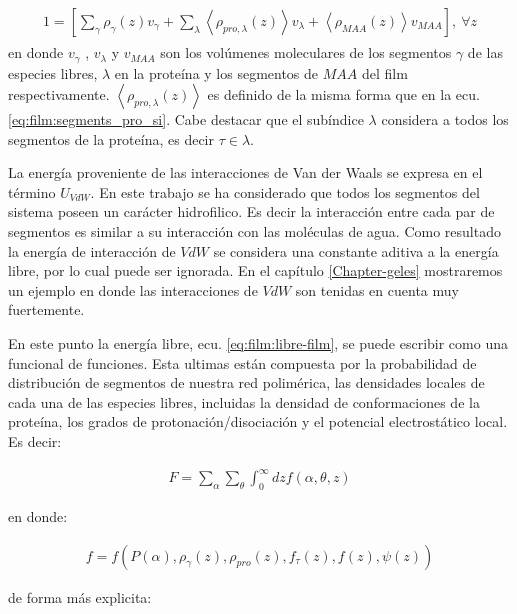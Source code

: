 \begin{align}
	\begin{aligned}
		1=  {\left[\sum_{\gamma}\rho_\gamma(z) v_\gamma + \sum_\lambda{\left<\rho_{pro,\lambda}(z)\right>v_\lambda} + \left<\rho_{MAA}(z)\right>v_{MAA} \right]},~ \forall z
	\end{aligned}
	\label{eq:film:constraint}
\end{align}
\noindent en donde $v_\gamma$ , $v_\lambda$ y $v_{MAA}$ son los vol\'umenes moleculares de los segmentos $\gamma$ de las especies libres, $\lambda$  en la prote\'ina y los segmentos de $MAA$ del film respectivamente.
$\left<\rho_{pro,\lambda}(z)\right>$ es definido de la misma forma que en la ecu.  \ref{eq:film:segments_pro_si}.
Cabe destacar que el sub\'indice $\lambda$ considera a todos los segmentos de la prote\'ina, es decir $ \tau \in \lambda$.

La energ\'ia proveniente de las interacciones de Van der Waals se expresa en el t\'ermino $U_{VdW}$. En este trabajo se ha considerado que todos los segmentos del sistema poseen un car\'acter hidrofilico. Es decir la interacci\'on entre cada par de segmentos es similar a su interacci\'on con las mol\'eculas de agua. Como resultado la energ\'ia de interacci\'on de $VdW$ se considera una constante aditiva a la energ\'ia libre, por lo cual puede ser ignorada. En el cap\'itulo \ref{Chapter-geles} mostraremos un ejemplo en donde las interacciones de $VdW$ son tenidas en cuenta muy fuertemente. 

En este punto la energ\'ia libre, ecu. \ref{eq:film:libre-film}, se puede escribir como una funcional de funciones. Esta ultimas est\'an compuesta por la probabilidad de distribuci\'on de segmentos de nuestra red polim\'erica, las densidades locales de cada una de las especies libres, incluidas la densidad de conformaciones de la prote\'ina, los grados de protonaci\'on/disociaci\'on y el potencial electrost\'atico local. Es decir:

\begin{align}
	F = \sum_\alpha \sum_\theta \int_0^\infty dz f(\alpha, \theta,z)
\end{align}

\noindent en donde:

\begin{align}
	 f=  f \left( P(\alpha), \rho_\gamma(z),\rho_{pro}(z), f_\tau(z), f(z), \psi(z)  \right)
	 \label{eq:film:funcionales}
 \end{align}

de forma m\'as explicita:

